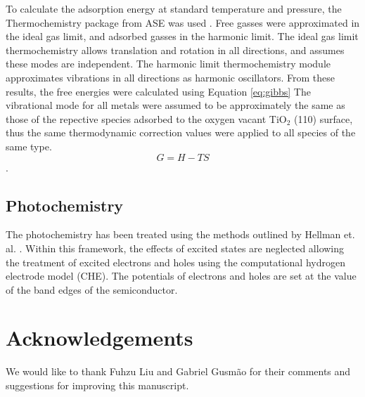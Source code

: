 To calculate the adsorption energy at standard temperature and pressure, the Thermochemistry package from ASE was used \cite{ase-paper}. Free gasses were approximated in the ideal gas limit, and adsorbed gasses in the harmonic limit. The ideal gas limit thermochemistry allows translation and rotation in all directions, and assumes these modes are independent. The harmonic limit thermochemistry module approximates vibrations in all directions as harmonic oscillators. From these results, the free energies were calculated using Equation \ref{eq:gibbs} The vibrational mode for all metals were assumed to be approximately the same as those of the repective species adsorbed to the oxygen vacant TiO$_2$ (110) surface, thus the same thermodynamic correction values were applied to all species of the same type.
\begin{equation}
    G=H-TS
    \label{eq:gibbs}
\end{equation}. 

\subsection{Photochemistry}
The photochemistry has been treated using the methods outlined by Hellman et. al. \cite{Hellman2017}. Within this framework, the effects of excited states are neglected allowing the treatment of excited electrons and holes using the computational hydrogen electrode model (CHE). The potentials of electrons and holes are set at the value of the band edges of the semiconductor.

\section{Acknowledgements}
We would like to thank Fuhzu Liu and Gabriel Gusmão for their comments and suggestions for improving this manuscript.





